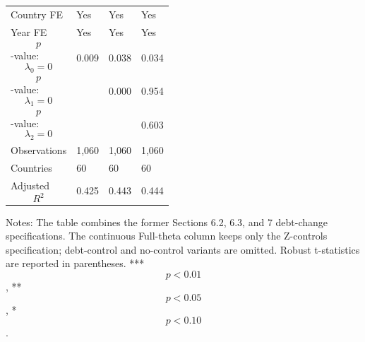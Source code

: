 \begin{table}[H]
\begin{threeparttable}
\begin{tabularx}{\textwidth}{lYYY}
Country FE & Yes & Yes & Yes \\
Year FE & Yes & Yes & Yes \\
$$p$$-value: $$\lambda_0=0$$ & 0.009 & 0.038 & 0.034 \\
$$p$$-value: $$\lambda_1=0$$ &  & 0.000 & 0.954 \\
$$p$$-value: $$\lambda_2=0$$ &  &  & 0.603 \\
Observations & 1,060 & 1,060 & 1,060 \\
Countries & 60 & 60 & 60 \\
Adjusted $$R^2$$ & 0.425 & 0.443 & 0.444 \\
\bottomrule
\end{tabularx}
\begin{tablenotes}[flushleft]\footnotesize
\item Notes: The table combines the former Sections 6.2, 6.3, and 7 debt-change specifications. The continuous Full-theta column keeps only the Z-controls specification; debt-control and no-control variants are omitted. Robust t-statistics are reported in parentheses. *** $$p<0.01$$, ** $$p<0.05$$, * $$p<0.10$$.
\end{tablenotes}
\end{threeparttable}
\end{table}
